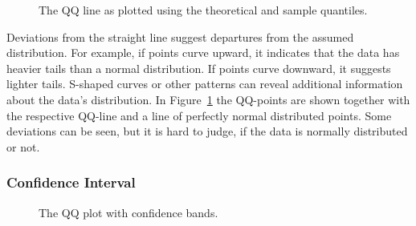 \documentclass[
  a4paper,
]{scrbook}
\begin{document}
\begin{figure}[H]


\caption{\label{fig-qq-line}The QQ line as plotted using the theoretical
and sample quantiles.}

\end{figure}%

Deviations from the straight line suggest departures from the assumed
distribution. For example, if points curve upward, it indicates that the
data has heavier tails than a normal distribution. If points curve
downward, it suggests lighter tails. S-shaped curves or other patterns
can reveal additional information about the data's distribution. In
Figure~\ref{fig-qq-line} the QQ-points are shown together with the
respective QQ-line and a line of perfectly normal distributed points.
Some deviations can be seen, but it is hard to judge, if the data is
normally distributed or not.

\subsubsection{Confidence Interval}\label{confidence-interval}

\begin{figure}[H]


\caption{\label{fig-qq-bands}The QQ plot with confidence bands.}

\end{figure}%
\end{document}
